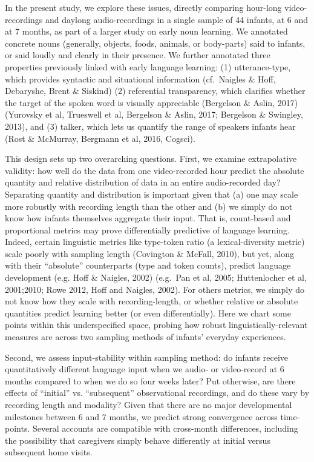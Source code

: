 \documentclass[man]{apa6}
\theoremstyle{definition}
\theoremstyle{definition}
\theoremstyle{definition}
\theoremstyle{remark}
\begin{document}
In the present study, we explore these issues, directly comparing
hour-long video-recordings and daylong audio-recordings in a single
sample of 44 infants, at 6 and at 7 months, as part of a larger study on
early noun learning. We annotated concrete nouns (generally, objects,
foods, animals, or body-parts) said to infants, or said loudly and
clearly in their presence. We further annotated three properties
previously linked with early language learning: (1) utterance-type,
which provides syntactic and situational information (cf.~Naigles \&
Hoff, Debaryshe, Brent \& Siskind) (2) referential transparency, which
clarifies whether the target of the spoken word is visually appreciable
(Bergelson \& Aslin, 2017) (Yurovsky et al, Trueswell et al, Bergelson
\& Aslin, 2017; Bergelson \& Swingley, 2013), and (3) talker, which lets
us quantify the range of speakers infants hear (Rost \& McMurray,
Bergmann et al, 2016, Cogsci).

This design sets up two overarching questions. First, we examine
extrapolative validity: how well do the data from one video-recorded
hour predict the absolute quantity and relative distribution of data in
an entire audio-recorded day? Separating quantity and distribution is
important given that (a) one may scale more robustly with recording
length than the other and (b) we simply do not know how infants
themselves aggregate their input. That is, count-based and proportional
metrics may prove differentially predictive of language learning.
Indeed, certain linguistic metrics like type-token ratio (a
lexical-diversity metric) scale poorly with sampling length (Covington
\& McFall, 2010), but yet, along with their \enquote{absolute}
counterparts (type and token counts), predict language development (e.g.
Hoff \& Naigles, 2002) (e.g.~Pan et al, 2005; Huttenlocher et al,
2001;2010; Rowe 2012, Hoff and Naigles, 2002). For others metrics, we
simply do not know how they scale with recording-length, or whether
relative or absolute quantities predict learning better (or even
differentially). Here we chart some points within this underspecified
space, probing how robust linguistically-relevant measures are across
two sampling methods of infants' everyday experiences.

Second, we assess input-stability within sampling method: do infants
receive quantitatively different language input when we audio- or
video-record at 6 months compared to when we do so four weeks later? Put
otherwise, are there effects of \enquote{initial} vs.
\enquote{subsequent} observational recordings, and do these vary by
recording length and modality? Given that there are no major
developmental milestones between 6 and 7 months, we predict strong
convergence across time-points. Several accounts are compatible with
cross-month differences, including the possibility that caregivers
simply behave differently at initial versus subsequent home visits.
\end{document}
